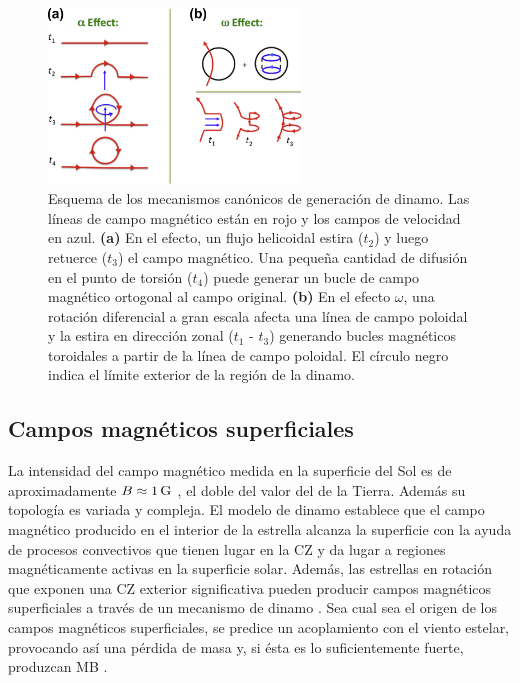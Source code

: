 \begin{figure}
    \centering
    \includegraphics[width=0.6\textwidth]{img/tesis/alpha_omega_effect.png}
    \caption{Esquema de los mecanismos canónicos de generación de dinamo. Las líneas de campo magnético están en rojo y los campos de velocidad en azul. \textbf{(a)} En el efecto, un flujo helicoidal estira ($t_2$) y luego retuerce ($t_3$) el campo magnético. Una pequeña cantidad de difusión en el punto de torsión ($t_4$) puede generar un bucle de campo magnético ortogonal al campo original. \textbf{(b)} En el efecto $\omega$, una rotación diferencial a gran escala afecta una línea de campo poloidal y la estira en dirección zonal ($t_1$ - $t_3$) generando bucles magnéticos toroidales a partir de la línea de campo poloidal. El círculo negro indica el límite exterior de la región de la dinamo. \cite{Stanley2014}}
    \label{fig:alpha_omega_effect}
\end{figure}


\subsection{Campos magnéticos superficiales} \label{surf_mf}
La intensidad del campo magnético medida en la superficie del Sol es de aproximadamente $B\approx1\,\mathrm{G}$ \citep{Weber1967,DAntona2000,Morin2012}, el doble del valor del de la Tierra. Además su topología es variada y compleja. El modelo de dinamo establece que el campo magnético producido en el interior de la estrella alcanza la superficie con la ayuda de procesos convectivos que tienen lugar en la CZ y da lugar a regiones magnéticamente activas en la superficie solar. Además, las estrellas en rotación que exponen una CZ exterior significativa pueden producir campos magnéticos superficiales a través de un mecanismo de dinamo \citep[ver][para más detalles]{Brandenburg2004,Charbonneau2010,Brun2017}. Sea cual sea el origen de los campos magnéticos superficiales, se predice un acoplamiento con el viento estelar, provocando así una pérdida de masa y, si ésta es lo suficientemente fuerte, produzcan MB \citep[ver][para más detalles]{UdDoula2002,Ud-Doula2007,Ud-Doula2008,Meynet2010}.\par


